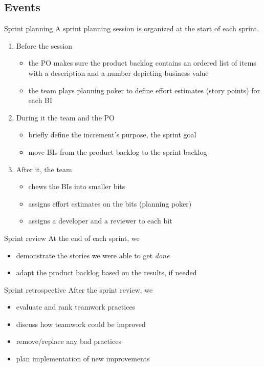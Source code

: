 \documentclass{beamer}
\begin{document}
\subsection{Events}
\begin{frame}{Sprint planning}
  A sprint planning session is organized at the start of each sprint.
  \begin{enumerate}
  \item Before the session
    \begin{itemize}
    \item the PO makes sure the product backlog contains an ordered list
    of items with a description and a number depicting business value
    \item the team plays planning poker to define effort estimates
    (story points) for each BI
    \end{itemize}
  \item During it the team and the PO
    \begin{itemize}
    \item briefly define the increment's purpose, the \alert{sprint goal}
    \item move BIs from the product backlog to the \alert{sprint backlog}
    \end{itemize}
  \item After it, the team
    \begin{itemize}
    \item chews the BIs into smaller bits
    \item assigns effort estimates on the bits (planning poker)
    \item assigns a developer and a reviewer to each bit
    \end{itemize}
  \end{enumerate}
\end{frame}
\begin{frame}{Sprint review}
  At the end of each sprint, we
  \begin{itemize}
  \item demonstrate the stories we were able to get \emph{done}
  \item adapt the product backlog based on the results, if needed
  \end{itemize}
\end{frame}
\begin{frame}{Sprint retrospective}
  After the sprint review, we
  \begin{itemize}
  \item evaluate and rank teamwork practices
  \item discuss how teamwork could be improved
  \item remove/replace any bad practices
  \item plan implementation of new improvements
  \end{itemize}
\end{frame}
\end{document}
